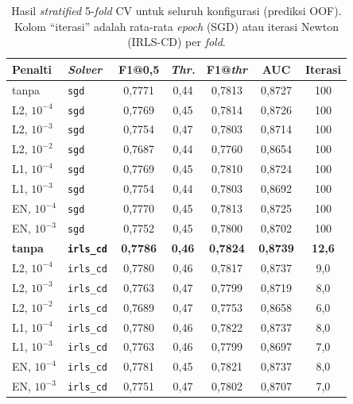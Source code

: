 \begin{table}[H]
	\centering
	\caption{Hasil \textit{stratified} 5-\textit{fold} CV untuk seluruh konfigurasi (prediksi OOF). Kolom ``iterasi'' adalah rata-rata \textit{epoch} (SGD) atau iterasi Newton (IRLS-CD) per \textit{fold}.}
	\label{tab:lr-cv}
	\small
	\begin{tabular}{l l c c c c c}
		\toprule
		\textbf{Penalti} & \textbf{\textit{Solver}} & \textbf{F1@0,5} & \textbf{\textit{Thr.}} & \textbf{F1@\textit{thr}} & \textbf{AUC} & \textbf{Iterasi} \\
		\midrule
		tanpa & \texttt{sgd} & 0,7771 & 0,44 & 0,7813 & 0,8727 & 100 \\
		L2, $10^{-4}$ & \texttt{sgd} & 0,7769 & 0,45 & 0,7814 & 0,8726 & 100 \\
		L2, $10^{-3}$ & \texttt{sgd} & 0,7754 & 0,47 & 0,7803 & 0,8714 & 100 \\
		L2, $10^{-2}$ & \texttt{sgd} & 0,7687 & 0,44 & 0,7760 & 0,8654 & 100 \\
		L1, $10^{-4}$ & \texttt{sgd} & 0,7769 & 0,45 & 0,7810 & 0,8724 & 100 \\
		L1, $10^{-3}$ & \texttt{sgd} & 0,7754 & 0,44 & 0,7803 & 0,8692 & 100 \\
		EN, $10^{-4}$ & \texttt{sgd} & 0,7770 & 0,45 & 0,7813 & 0,8725 & 100 \\
		EN, $10^{-3}$ & \texttt{sgd} & 0,7752 & 0,45 & 0,7800 & 0,8702 & 100 \\
		\midrule
		\textbf{tanpa} & \textbf{\texttt{irls\_cd}} & \textbf{0,7786} & \textbf{0,46} & \textbf{0,7824} & \textbf{0,8739} & \textbf{12,6} \\
		L2, $10^{-4}$ & \texttt{irls\_cd} & 0,7780 & 0,46 & 0,7817 & 0,8737 & 9,0 \\
		L2, $10^{-3}$ & \texttt{irls\_cd} & 0,7763 & 0,47 & 0,7799 & 0,8719 & 8,0 \\
		L2, $10^{-2}$ & \texttt{irls\_cd} & 0,7689 & 0,47 & 0,7753 & 0,8658 & 6,0 \\
		L1, $10^{-4}$ & \texttt{irls\_cd} & 0,7780 & 0,46 & 0,7822 & 0,8737 & 8,0 \\
		L1, $10^{-3}$ & \texttt{irls\_cd} & 0,7763 & 0,46 & 0,7799 & 0,8697 & 7,0 \\
		EN, $10^{-4}$ & \texttt{irls\_cd} & 0,7781 & 0,45 & 0,7821 & 0,8737 & 8,0 \\
		EN, $10^{-3}$ & \texttt{irls\_cd} & 0,7751 & 0,47 & 0,7802 & 0,8707 & 7,0 \\
		\bottomrule
	\end{tabular}
\end{table}

